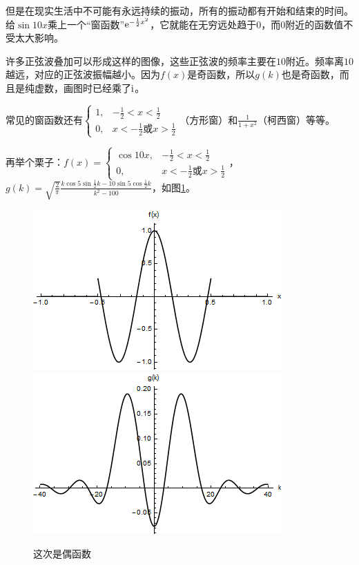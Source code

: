但是在现实生活中不可能有永远持续的振动，所有的振动都有开始和结束的时间。给$\sin 10 x$乘上一个“窗函数”$\mathrm{e}^{-\frac{1}{2} x^2}$，它就能在无穷远处趋于$0$，而$0$附近的函数值不受太大影响。

许多正弦波叠加可以形成这样的图像，这些正弦波的频率主要在$10$附近。频率离$10$越远，对应的正弦波振幅越小。因为$f(x)$是奇函数，所以$g(k)$也是奇函数，而且是纯虚数，画图时已经乘了$\mathrm{i}$。

常见的窗函数还有$\begin{cases} 1, &-\frac{1}{2}<x<\frac{1}{2} \\ 0, &x<-\frac{1}{2} \text{或} x>\frac{1}{2} \end{cases}$（方形窗）和$\frac{1}{1+x^2}$（柯西窗）等等。

再举个栗子：$f(x)=\begin{cases} \cos 10 x, &-\frac{1}{2}<x<\frac{1}{2} \\ 0, &x<-\frac{1}{2} \text{或} x>\frac{1}{2} \end{cases}$，$g(k)=\sqrt{\frac{2}{\pi}} \frac{k \cos 5 \sin \frac{1}{2} k-10 \sin 5 \cos \frac{1}{2} k}{k^2-100}$，如图\ref{fig-block-sin10x}。
\begin{figure}[htb]
\centering
\includegraphics[scale=0.5]{fig/block-sin10x.png}
\includegraphics[scale=0.5]{fig/block-sin10x-g.png}
\caption{这次是偶函数}
\label{fig-block-sin10x}
\end{figure}

